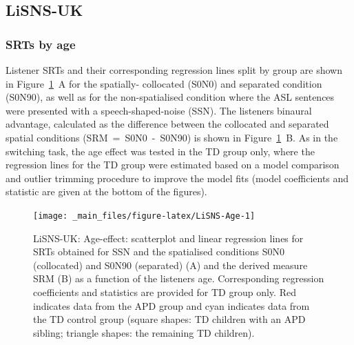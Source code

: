 \documentclass[a4paper, twoside]{templates/ociamthesis}
\begin{document}
\hypertarget{lisns-uk}{%
\subsection{LiSNS-UK}\label{lisns-uk}}

\hypertarget{srts-by-age}{%
\subsubsection*{SRTs by age}\label{srts-by-age}}

Listener SRTs and their corresponding regression lines split by group are shown in Figure~\ref{fig:LiSNS-Age}~A for the spatially- collocated (S0N0) and separated condition (S0N90), as well as for the non-spatialised condition where the ASL sentences were presented with a speech-shaped-noise (SSN). The listeners binaural advantage, calculated as the difference between the collocated and separated spatial conditions (SRM~=~S0N0~-~S0N90) is shown in Figure~\ref{fig:LiSNS-Age}~B. As in the switching task, the age effect was tested in the TD group only, where the regression lines for the TD group were estimated based on a model comparison and outlier trimming procedure to improve the model fits (model coefficients and statistic are given at the bottom of the figures).\\

\begin{figure}

{\centering \texttt{[image: \_main\_files/figure-latex/LiSNS-Age-1]} 

}

\caption{LiSNS-UK: Age-effect: scatterplot and linear regression lines for SRTs obtained for SSN and the spatialised conditions S0N0 (collocated) and S0N90 (separated) (A) and the derived measure SRM (B) as a function of the listeners age. Corresponding regression coefficients and statistics are provided for TD group only. Red indicates data from the APD group and cyan indicates data from the TD control group (square shapes: TD children with an APD sibling; triangle shapes: the remaining TD children).}\label{fig:LiSNS-Age}
\end{figure}
\end{document}
